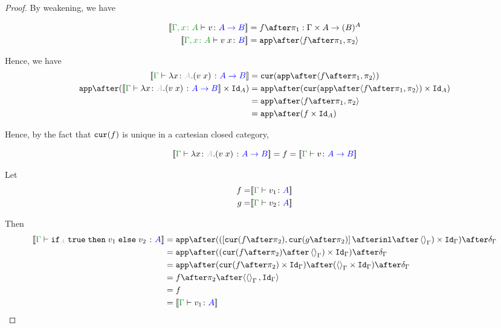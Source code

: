 \documentclass{report}
\begin{document}
\begin{framed}
\begin{proof}
        By weakening, we have
        
        \begin{align*}
            \deno{\typerelation{\gax}{v}{\ab}} & = f \after \p : \G \times A \rightarrow (B)^A \\
            \deno{\typerelation{\gax}{\apply{v}{x}}{B}} & = \app\after\pr{f \after \p}{\pp}
        \end{align*}
        
        Hence, we have 
        \begin{align}
                \deno{\gtyperelation{\lam{x}{A}{(\apply{v}{x})}}{\ab}} & = \cur{\app\after\pr{f \after \p}{\pp}}\\
                \app\after(\deno{\gtyperelation{\lam{x}{A}{(\apply{v}{x})}}{\ab}} \times \Id{A}) & = \app \after(\cur{\app\after\pr{f \after \p}{\pp}}\times \Id{A})\\
                & = \app \after\pr{f\after\p}{\pp}\\
                & = \app\after(f\times\Id{A})
        \end{align}
        
        Hence, by the fact that $\texttt{cur}(f)$ is unique in a cartesian closed category, 
        
        \begin{equation}
            \deno{\gtyperelation{\lam{x}{A}{(\apply{v}{x})}}{\ab}} = f =\deno{\gtyperelation{v}{\ab}}
        \end{equation}
        
        Let
        \begin{align*}
            f = &\deno{\gtyperelation{v_1}{ A}}\\
            g = &\deno{\gtyperelation{v_2}{ A}}\\
        \end{align*}
        
        Then
        \begin{equation}
            \begin{split}
                \deno{\gtyperelation{\pifthenelse{A}{\t}{v_1}{v_2}}{ A}} & = \ifMorph{\inl\after\term{\G}}{f}{g} \\
                & = \app\after((\cur{f\after\pp}\after\term{\G})\times\idg)\after\diag{\G}\\
                & = \app\after(\cur{f\after\pp}\times\idg)\after(\term{\G}\times\idg)\after\diag{\G}\\
                & = f\after\pp\after\pr{\term{\G}}{\idg}\\
                & = f \\
                & = \deno{\gtyperelation{v_1}{ A}}\\
            \end{split}
        \end{equation}
        

\end{proof}
\end{framed}
\end{document}
